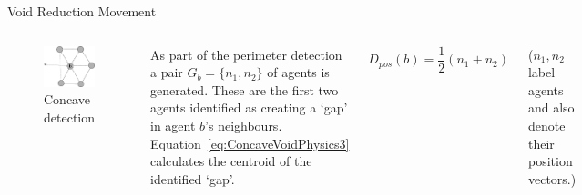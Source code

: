 \documentclass{beamer}
\begin{document}
\begin{frame}{Void Reduction Movement}
  \begin{columns}
    \begin{figure}
      \begin{center}
        \includegraphics[width=5cm]{VoidConcave1.pdf}
      \end{center}
      \caption{Concave detection}
    \end{figure}
    As part of the perimeter detection a pair $G_b = \{n_1, n_2\}$ of agents is generated. These are the first two agents identified as creating a `gap' in agent $b$'s neighbours. Equation~\ref{eq:ConcaveVoidPhysics3} calculates the centroid of the identified `gap'.
    \begin{center}
      \begin{equation}‎
      D_{pos}(b)=\frac{1}{2} (n_1 + n_2) %
      \label{eq:ConcaveVoidPhysics3}‎
      \end{equation}
    \end{center}
    ($n_1, n_2$ label agents and also denote their position vectors.)
  \end{columns}
\end{frame}
\end{document}

